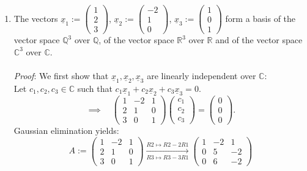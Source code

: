 \documentclass[
  12pt,
  a4paper,
  twoside]{article}
\theoremstyle{plain}
\theoremstyle{definition}
\begin{document}
\begin{enumerate}
\def\labelenumi{(\alph{enumi})}
\item
  The vectors \(\underline{x}_1:= \begin{pmatrix} 1 \\ 2 \\ 3 \end{pmatrix}\),
  \(\underline{x}_2:= \begin{pmatrix} -2 \\ 1 \\ 0 \end{pmatrix}\),
  \(\underline{x}_3:= \begin{pmatrix} 1 \\ 0 \\ 1 \end{pmatrix}\)
  form a basis of the vector space \(\mathbb{Q}^3\) over \(\mathbb{Q}\),
  of the vector space \(\mathbb{R}^3\) over \(\mathbb{R}\)
  and of the vector space \(\mathbb{C}^3\) over \(\mathbb{C}\).\\
  \hspace*{0.333em}\\
  \emph{Proof}:
  We first show that \(\underline{x}_1, \underline{x}_2, \underline{x}_3\) are linearly independent over \(\mathbb{C}\):\\
  Let \(c_1, c_2, c_3 \in \mathbb{C}\) such that \(c_1 \underline{x}_1 + c_2 \underline{x}_2 + c_3 \underline{x}_3 =0\).
  \[
  \implies \quad \begin{pmatrix} 1 & -2 & 1 \\ 2 & 1 & 0 \\ 3 & 0 & 1 \end{pmatrix} \begin{pmatrix} c_1 \\ c_2 \\ c_3 \end{pmatrix} = \begin{pmatrix} 0 \\ 0 \\ 0 \end{pmatrix}.
  \]
  Gaussian elimination yields:
  \[
  A:= \begin{pmatrix} 1 & -2 & 1 \\ 2 & 1 & 0 \\ 3 & 0 & 1 \end{pmatrix}
  \xrightarrow[R3 \mapsto R3 - 3R1]{R2 \mapsto R2 - 2R1}
  \begin{pmatrix} 1 & -2 & 1 \\ 0 & 5 & -2 \\ 0 & 6 & -2 \end{pmatrix}
\]
\end{enumerate}
\end{document}
